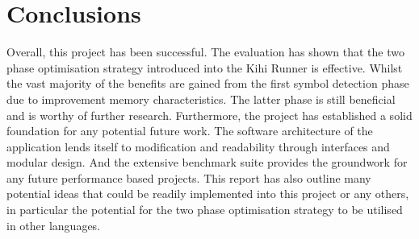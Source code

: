 \chapter{Conclusions}\label{C:con}
Overall, this project has been successful. The evaluation has shown that the two phase optimisation strategy introduced into the Kihi Runner is effective. Whilst the vast majority of the benefits are gained from the first symbol detection phase due to improvement memory characteristics. The latter phase is still beneficial and is worthy of further research. Furthermore, the project has established a solid foundation for any potential future work. The software architecture of the application lends itself to modification and readability through interfaces and modular design. And the extensive benchmark suite provides the groundwork for any future performance based projects. This report has also outline many potential ideas that could be readily implemented into this project or any others, in particular the potential for the two phase optimisation strategy to be utilised in other languages.
